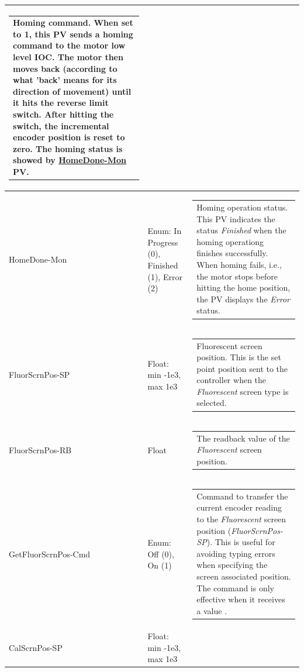 \documentclass[openany]{article}
\begin{document}
\begin{longtable}{| m{4.5cm} m{2.5cm}  m{7.0cm} |}
\begin{tabular}{@{}m{6cm}@{}}
                Homing command. When set to 1, this PV sends a homing command to the motor low level IOC. The motor then moves back (according to what 'back' means for its direction of movement) until it hits the reverse limit switch. After hitting the switch, the incremental encoder position is reset to zero. The homing status is showed by \hyperlink{pv:home-done-mon}{HomeDone-Mon} PV.
            \end{tabular} \hypertarget{pv:home-done-mon}{}\\ \hline
        HomeDone-Mon & Enum: In Progress (0), Finished (1), Error (2) & \begin{tabular}{@{}m{6cm}@{}}
                Homing operation status. This PV indicates the status \emph{Finished} when the homing operationg finishes successfully. When homing fails, i.e., the motor stops before hitting the home position, the PV displays the \emph{Error} status.
            \end{tabular} \hypertarget{pv:fluor-scrn-pos}{}\\ \hline
        FluorScrnPos-SP & Float: min -1e3, max 1e3 & \begin{tabular}{@{}m{6cm}@{}}
                Fluorescent screen position. This is the set point position sent to the controller when the \emph{Fluorescent} screen type is selected.
            \end{tabular} \hypertarget{}{}\\ \hline
        FluorScrnPos-RB & Float & \begin{tabular}{@{}m{6cm}@{}}
                The readback value of the \emph{Fluorescent} screen position.
            \end{tabular} \hypertarget{pv:get-fluor-scrn-pos-cmd}{}\\ \hline
        GetFluorScrnPos-Cmd & Enum: Off (0), On (1) & \begin{tabular}{@{}m{6cm}@{}}
                Command to transfer the current encoder reading to the \emph{Fluorescent} screen position (\emph{FluorScrnPos-SP}). This is useful for avoiding typing errors when specifying the screen associated position. The command is only effective when it receives a value $\neq 0$.
            \end{tabular} \hypertarget{pv:cal-scrn-pos}{}\\ \hline
        CalScrnPos-SP & Float: min -1e3, max 1e3 & \begin{tabular}{@{}m{6cm}@{}}

\end{tabular}
\end{longtable}
\end{document}
